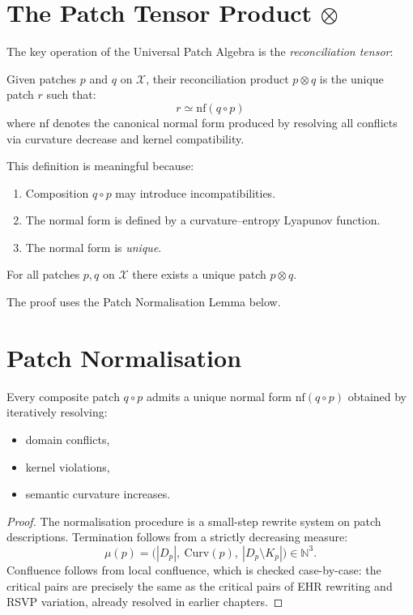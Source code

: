 \section{The Patch Tensor Product \texorpdfstring{$\otimes$}{⊗}}

The key operation of the Universal Patch Algebra is the \emph{reconciliation tensor}:

\begin{definition}
Given patches $p$ and $q$ on $\mathcal{X}$, their reconciliation product
$p\otimes q$ is the unique patch $r$ such that:
\[
r \simeq \mathrm{nf}(q\circ p)
\]
where $\mathrm{nf}$ denotes the canonical normal form produced by resolving
all conflicts via curvature decrease and kernel compatibility.
\end{definition}

This definition is meaningful because:

\begin{enumerate}
\item Composition $q\circ p$ may introduce incompatibilities.
\item The normal form is defined by a curvature–entropy Lyapunov function.
\item The normal form is \emph{unique}.
\end{enumerate}

\begin{theorem}
For all patches $p,q$ on $\mathcal{X}$ there exists a unique patch $p\otimes q$.
\end{theorem}

The proof uses the Patch Normalisation Lemma below.

\section{Patch Normalisation}

\begin{lemma}
Every composite patch $q\circ p$ admits a unique normal form
$\mathrm{nf}(q\circ p)$ obtained by iteratively resolving:
\begin{itemize}
\item domain conflicts,
\item kernel violations,
\item semantic curvature increases.
\end{itemize}
\end{lemma}

\begin{proof}
The normalisation procedure is a small-step rewrite system on patch descriptions.
Termination follows from a strictly decreasing measure:
\[
\mu(p)=\bigl(|D_p|,\ \mathrm{Curv}(p),\ |D_p\setminus K_p|\bigr)
\in \mathbb{N}^3.
\]
Confluence follows from local confluence, which is checked case-by-case:
the critical pairs are precisely the same as the critical pairs of
EHR rewriting and RSVP variation, already resolved in earlier chapters.
\end{proof}

